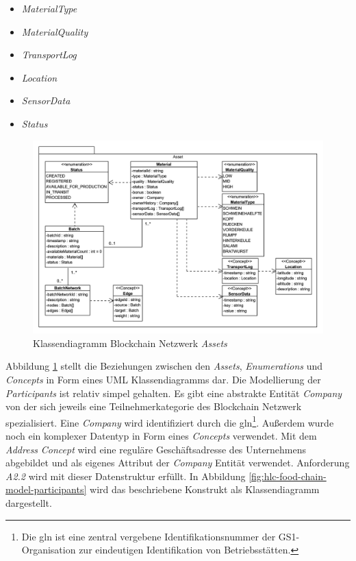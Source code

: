 \begin{itemize}
	\item \textit{MaterialType}
	\item \textit{MaterialQuality}
	\item \textit{TransportLog}
	\item \textit{Location}
	\item \textit{SensorData}
	\item \textit{Status}
\end{itemize}

\begin{figure}[H]
	\centering
	\includegraphics[width=1\linewidth]{pictures/hlc-food-chain-model-assets}
	\caption[Klassendiagramm Blockchain Netzwerk \textit{Assets}]{Klassendiagramm Blockchain Netzwerk \textit{Assets}}
	\label{fig:hlc-food-chain-model-assets}
\end{figure}

\noindent
Abbildung \ref{fig:hlc-food-chain-model-assets} stellt die Beziehungen zwischen den \textit{Assets}, \textit{Enumerations} und \textit{Concepts} in Form eines UML Klassendiagramms dar. Die Modellierung der \textit{Participants} ist relativ simpel gehalten. Es gibt eine abstrakte Entität \textit{Company} von der sich jeweils eine Teilnehmerkategorie des Blockchain Netzwerk spezialisiert. Eine \textit{Company} wird identifiziert durch die \ac{gln}\footnote{Die \ac{gln} ist eine zentral vergebene Identifikationsnummer der GS1-Organisation zur eindeutigen Identifikation von Betriebsstätten.}. Außerdem wurde noch ein komplexer Datentyp in Form eines \textit{Concepts} verwendet. Mit dem \textit{Address} \textit{Concept} wird eine reguläre Geschäftsadresse des Unternehmens abgebildet und als eigenes Attribut der \textit{Company} Entität verwendet. Anforderung \textit{A2.2} wird mit dieser Datenstruktur erfüllt. In Abbildung \ref{fig:hlc-food-chain-model-participants} wird das beschriebene Konstrukt als Klassendiagramm dargestellt.

